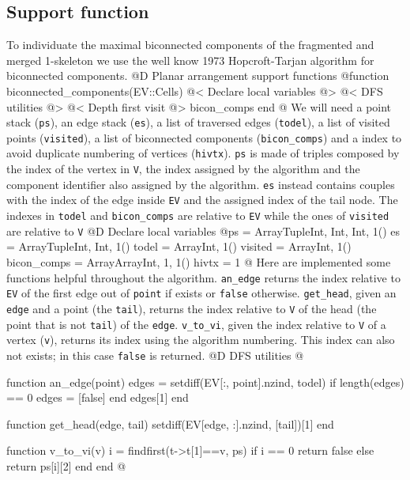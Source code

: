 \documentclass[10pt]{book}
\begin{document}
\subsection{Support function}
\label{sec:biconnected_components}
To individuate the maximal biconnected components of the fragmented and merged 1-skeleton
we use the well know 1973 Hopcroft-Tarjan algorithm for biconnected components\cite{Hopcroft-Tarjan}.
@D Planar arrangement support functions
@{function biconnected_components(EV::Cells)
    @< Declare local variables @>
    @< DFS utilities @>
    @< Depth first visit @>
    bicon_comps
end
@}
We will need a point stack (\texttt{ps}), an edge stack (\texttt{es}), a list of traversed edges (\texttt{todel}), a list of 
visited points (\texttt{visited}), a list of biconnected components (\texttt{bicon\_comps}) and a index to avoid duplicate 
numbering of vertices (\texttt{hivtx}). \texttt{ps} is made of triples composed by the index of the vertex in \texttt{V}, 
the index assigned by the algorithm and the component identifier also assigned by the algorithm. \texttt{es} instead 
contains couples with the index of the edge inside \texttt{EV} and the assigned index of the tail node. The indexes 
in \texttt{todel} and \texttt{bicon\_comps} are relative to \texttt{EV} while the ones of \texttt{visited} are
relative to \texttt{V}
@D Declare local variables
@{ps = Array{Tuple{Int, Int, Int}, 1}()
es = Array{Tuple{Int, Int}, 1}()
todel = Array{Int, 1}()
visited = Array{Int, 1}()
bicon_comps = Array{Array{Int, 1}, 1}()
hivtx = 1
@}
Here are implemented some functions helpful throughout the algorithm.
\texttt{an\_edge} returns the index relative to \texttt{EV} of the first edge out of \texttt{point} if exists or 
\texttt{false} otherwise. \texttt{get\_head}, given an \texttt{edge} and a point (the \texttt{tail}), returns the 
index relative to \texttt{V} of the head (the point that is not \texttt{tail}) of the \texttt{edge}. 
\texttt{v\_to\_vi}, given the index relative to \texttt{V} of a vertex (\texttt{v}), returns its index using 
the algorithm numbering. This index can also not exists; in this case \texttt{false} is returned.
@D DFS utilities
@{function an_edge(point)
    edges = setdiff(EV[:, point].nzind, todel)
    if length(edges) == 0
        edges = [false]
    end
    edges[1]
end

function get_head(edge, tail)
    setdiff(EV[edge, :].nzind, [tail])[1]
end

function v_to_vi(v)
    i = findfirst(t->t[1]==v, ps)
    if i == 0
        return false
    else
        return ps[i][2]
    end
end
@}
\end{document}
